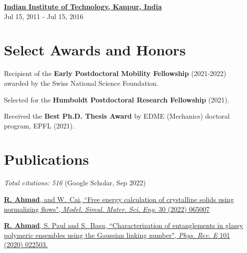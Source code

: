 \documentclass[margin,line]{resume}
\begin{document}
\begin{resume}
    \textbf{\href{http://www.iitk.ac.in/}{\textsf{Indian Institute of Technology, Kanpur, India}}}\vspace{0mm}\\
     \hfill \small{Jul 15, 2011 - Jul 15, 2016}
    \vspace{0cm}

    \section{\mysidestyle Select Awards and Honors}  \vspace{0mm}

    Recipient of the \textbf{Early Postdoctoral Mobility Fellowship} (2021-2022) awarded by the Swiss National Science Foundation.

    \vspace{-0.3cm}
    Selected for the \textbf{Humboldt Postdoctoral Research Fellowship} (2021).

    \vspace{-0.3cm}
    Received the \textbf{Best Ph.D. Thesis Award} by EDME (Mechanics) doctoral program, EPFL (2021).

    \section{\mysidestyle Publications}
    \small{\textit{Total citations: 516} (Google Scholar, Sep 2022)}

    \href{https://iopscience.iop.org/article/10.1088/1361-651X/ac7f4b} {\textbf{R. Ahmad}, and W.~Cai, ``Free energy calculation of crystalline solids using normalizing flows", \textit{Model. Simul. Mater. Sci. Eng.} 30 (2022) 065007}

    \href{https://journals.aps.org/pre/abstract/10.1103/PhysRevE.101.022503} {\textbf{R. Ahmad}, S. Paul and S.~Basu, ``Characterization of entanglements in glassy polymeric ensembles using the Gaussian linking number", \textit{Phys. Rev. E} 101 (2020) 022503.}


\end{resume}
\end{document}

